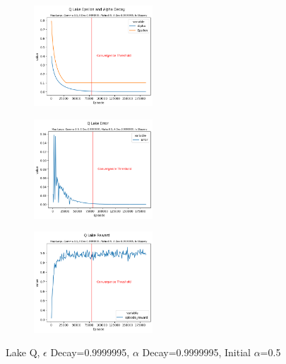 \documentclass[letterpaper]{article} %
\begin{document}
\begin{figure}[!htb]
	\centering
 	\begin{subfigure}[b]{0.275\textwidth}
			\centering
		\includegraphics[width=1.75in]{Figures/Q_Lake_Epsilon_and_Alpha_Decay_Map_Large__Gamma_0_9__E_Dec_0_9999995__Alpha_0_5__A_Dec_0_9999995__Is_Slippery.png}
  	\end{subfigure}%
	 \begin{subfigure}[b]{0.275\textwidth}
	 		\centering
		\includegraphics[width=1.75in]{Figures/Q_Lake_Error_Map_Large__Gamma_0_9__E_Dec_0_9999995__Alpha_0_5__A_Dec_0_9999995__Is_Slippery.png}
  	\end{subfigure}
	\begin{subfigure}[b]{0.5\textwidth}
			\centering
		\includegraphics[width=1.75in]{Figures/Q_Lake_Reward_Map_Large__Gamma_0_9__E_Dec_0_9999995__Alpha_0_5__A_Dec_0_9999995__Is_Slippery.png}
  	\end{subfigure}
\caption{Lake Q,  $\epsilon$ Decay=0.9999995, $\alpha$ Decay=0.9999995, Initial $\alpha$=0.5}
\label{fig:lake_q_e_9999995_a_9999995_rewards}
\end{figure}
\end{document}
